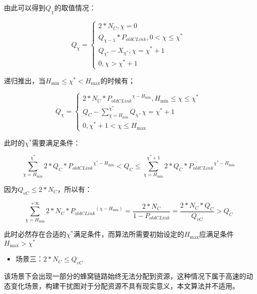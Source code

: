 \documentclass[figurelist,tablelist,algorithmlist,nomlist,masters]{seuthesix}
\begin{document}
	由此可以得到$Q_{\chi}$的取值情况：
	
	\begin{equation}\label{eq3.1}
	Q_{\chi } = \left\{ \begin{array}{l}
	2*N_C,\chi = 0\\
	Q_{\chi - 1}*{P_{oldCLink}},0 < \chi  \le \chi ^*\\
	Q_{\chi ^*} - X_{\chi ^*},\chi  = \chi ^* + 1\\
	0,\chi  > \chi ^* + 1
	\end{array} \right.
	\end{equation}
	
	递归推出，当$H_{\min } \le \chi ^* < H_{\max }$的时候有；
	
	\begin{equation}\label{eq3.1}
	Q_\chi  = \left\{ \begin{array}{l}
	2*N_C*{P_{oldCLink}}^{\chi - H_{\min }},H_{\min } \le \chi  \le \chi ^*\\
	Q_C - \sum\limits_{\chi = H_{\min }}^{\chi ^*} {Q_{\chi }} ,\chi  = {\chi ^* + 1}\\
	0,\chi ^* + 1 < \chi  \le {H_{\max }}
	\end{array} \right.
	\end{equation}
	
	此时的$\chi ^*$需要满足条件：
	
	\begin{equation}\label{eq3.1}
	\sum\limits_{\chi = H_{\min }}^{\chi ^*} {2*Q_C*{P_{oldCLink}}^{\chi ^* - H_{\min }}} < Q_C \le \sum\limits_{\chi = H_{\min }}^{\chi ^* + 1} {2*Q_C*{P_{oldCLink}}^{\chi ^* - H_{\min }}}
	\end{equation}
	
	因为$Q_{vC} \le 2*N_C$，所以有：
	
	\begin{equation}\label{eq3.1}
	\sum\limits_{\chi = H_{\min }}^{ + \infty } {2*N_C*{P_{oldCLink}}^(\chi - H_{\min })}  = \frac{{2*N_C}}{{1 - {P_{oldCLink}}}} = \frac{{2*N_C*Q_C}}{{Q_{vC}}} > Q_C
	\end{equation}
	
	此时必然存在合适的$\chi ^*$满足条件，而算法所需要初始设定的$H_{\max }$应满足条件$H_{\max } > \chi ^*$
	
	\begin{itemize}
		\item 场景三：$2*N_C \le Q_{vC}$
	\end{itemize}
	
	该场景下会出现一部分的蜂窝链路始终无法分配到资源，这种情况下属于高速的动态变化场景，构建干扰图对于分配资源不具有现实意义，本文算法并不适用。
	
\end{document}
